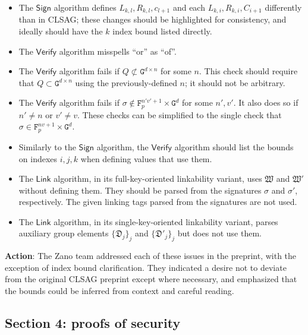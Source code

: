 \documentclass{article}
\begin{document}
\begin{itemize}
	\item The $\mathsf{Sign}$ algorithm defines $L_{k,l}, R_{k,l}, c_{l+1}$ and each $L_{k,i}, R_{k,i}, C_{i+1}$ differently than in CLSAG; these changes should be highlighted for consistency, and ideally should have the $k$ index bound listed directly.
	
	\item The $\mathsf{Verify}$ algorithm misspells ``or'' as ``of''.
	
	\item The $\mathsf{Verify}$ algorithm fails if $Q \not\subset \texttt{G}^{d \times n}$ for some $n$.
	This check should require that $Q \subset \texttt{G}^{d \times n}$ using the previously-defined $n$; it should not be arbitrary.
	
	\item The $\mathsf{Verify}$ algorithm fails if $\sigma \not\in \texttt{F}_p^{n'v' + 1} \times \texttt{G}^d$ for some $n', v'$.
	It also does so if $n' \neq n$ or $v' \neq v$.
	These checks can be simplified to the single check that $\sigma \in \texttt{F}_p^{nv + 1} \times \texttt{G}^d$.

	\item Similarly to the $\mathsf{Sign}$ algorithm, the $\mathsf{Verify}$ algorithm should list the bounds on indexes $i, j, k$ when defining values that use them.
	
	\item The $\mathsf{Link}$ algorithm, in its full-key-oriented linkability variant, uses $\mathfrak{W}$ and $\mathfrak{W}'$ without defining them.
	They should be parsed from the signatures $\sigma$ and $\sigma'$, respectively.
	The given linking tags parsed from the signatures are not used.

	\item The $\mathsf{Link}$ algorithm, in its single-key-oriented linkability variant, parses auxiliary group elements $\{ \mathfrak{D}_j \}_j$ and $\{ \mathfrak{D}'_j \}_j$ but does not use them.
\end{itemize}

\textbf{Action}: The Zano team addressed each of these issues in the preprint, with the exception of index bound clarification.
They indicated a desire not to deviate from the original CLSAG preprint except where necessary, and emphasized that the bounds could be inferred from context and careful reading.


\subsection{Section 4: proofs of security}
\end{document}
